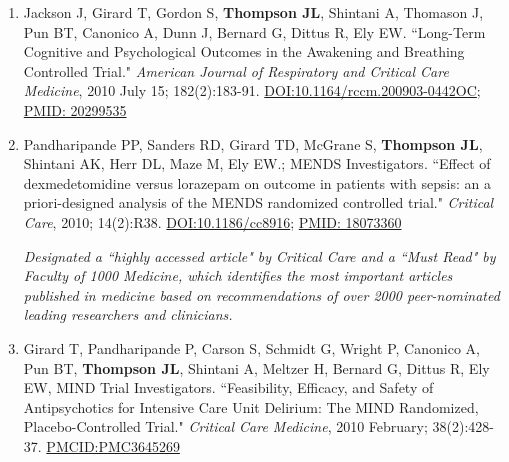 \documentclass[5pt]{article}
\begin{document}
\begin{enumerate}
\item Jackson J, Girard T, Gordon S, \textbf{Thompson JL}, Shintani A, Thomason J, Pun BT, Canonico A, Dunn J, Bernard G, Dittus R, Ely EW. ``Long-Term Cognitive and Psychological Outcomes in the Awakening and Breathing Controlled Trial." \emph{American Journal of Respiratory and Critical Care Medicine}, 2010 July 15; 182(2):183-91. \href{https://doi.org/10.1164/rccm.200903-0442OC}{DOI:10.1164/rccm.200903-0442OC}; \href{https://www.ncbi.nlm.nih.gov/pubmed/20299535}{PMID: 20299535}
\item Pandharipande PP, Sanders RD, Girard TD, McGrane S, \textbf{Thompson JL}, Shintani AK, Herr DL, Maze M, Ely EW.; MENDS Investigators. ``Effect of dexmedetomidine versus lorazepam on outcome in patients with sepsis: an a priori-designed analysis of the MENDS randomized controlled trial." \emph{Critical Care}, 2010; 14(2):R38. \href{https://doi.org/10.1186/cc8916}{DOI:10.1186/cc8916}; \href{https://www.ncbi.nlm.nih.gov/pubmed/18073360}{PMID: 18073360}

    \emph{Designated a ``highly accessed article" by Critical Care and a ``Must Read" by Faculty of 1000 Medicine, which identifies the most important articles published in medicine based on recommendations of over 2000 peer-nominated leading researchers and clinicians.}
\item Girard T, Pandharipande P, Carson S, Schmidt G, Wright P, Canonico A, Pun BT, \textbf{Thompson JL}, Shintani A, Meltzer H, Bernard G, Dittus R, Ely EW, MIND Trial Investigators. ``Feasibility, Efficacy, and Safety of Antipsychotics for Intensive Care Unit Delirium: The MIND Randomized, Placebo-Controlled Trial." \emph{Critical Care Medicine}, 2010 February; 38(2):428-37. \href{https://www.ncbi.nlm.nih.gov/pmc/articles/PMC3645269/}{PMCID:PMC3645269}


\end{enumerate}
\end{document}
